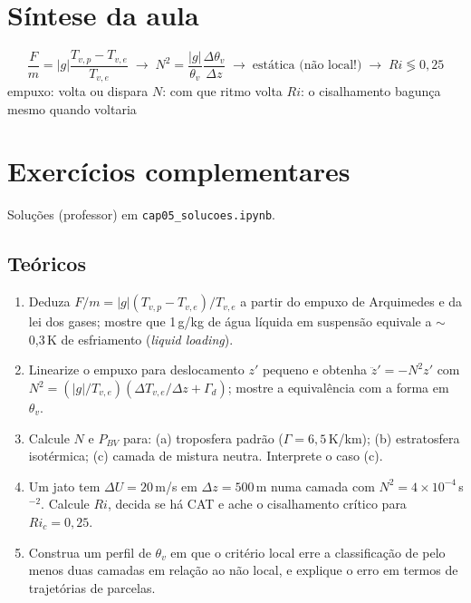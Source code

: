 \documentclass[11pt]{article}
\begin{document}
\section{Síntese da aula}

\begin{noquadro}
\[ \frac{F}{m} = |g|\frac{T_{v,p}-T_{v,e}}{T_{v,e}}
\;\to\; N^2 = \frac{|g|}{\theta_v}\frac{\Delta\theta_v}{\Delta z}
\;\to\; \text{estática (não local!)}
\;\to\; Ri \lessgtr 0{,}25 \]
empuxo: volta ou dispara \quad $N$: com que ritmo volta \quad
$Ri$: o cisalhamento bagunça mesmo quando voltaria
\end{noquadro}

\section{Exercícios complementares}\label{sec:exercicios}

Soluções (professor) em \texttt{cap05\_solucoes.ipynb}.

\subsection*{Teóricos}

\begin{enumerate}[label=\textbf{T\arabic*.},itemsep=4pt]
  \item Deduza $F/m = |g|(T_{v,p}-T_{v,e})/T_{v,e}$ a partir do empuxo de
        Arquimedes e da lei dos gases; mostre que 1\,g/kg de água líquida
        em suspensão equivale a $\sim$0{,}3\,K de esfriamento
        (\emph{liquid loading}).
  \item Linearize o empuxo para deslocamento $z'$ pequeno e obtenha
        $\ddot z' = -N^2 z'$ com
        $N^2 = (|g|/T_{v,e})(\Delta T_{v,e}/\Delta z + \Gamma_d)$; mostre
        a equivalência com a forma em $\theta_v$.
  \item Calcule $N$ e $P_{BV}$ para: (a) troposfera padrão
        ($\Gamma = 6{,}5$\,K/km); (b) estratosfera isotérmica; (c) camada
        de mistura neutra. Interprete o caso (c).
  \item Um jato tem $\Delta U = 20$\,m/s em $\Delta z = 500$\,m numa
        camada com $N^2 = 4\times10^{-4}$\,s$^{-2}$. Calcule $Ri$, decida
        se há CAT e ache o cisalhamento crítico para $Ri_c = 0{,}25$.
  \item Construa um perfil de $\theta_v$ em que o critério local erre a
        classificação de pelo menos duas camadas em relação ao não local,
        e explique o erro em termos de trajetórias de parcelas.
\end{enumerate}
\end{document}
